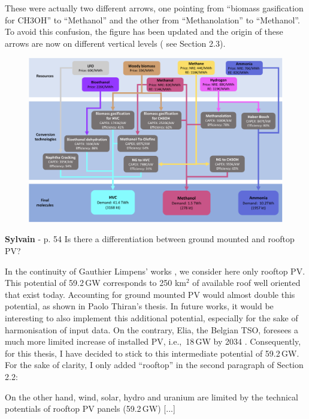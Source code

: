 \documentclass[12pt,a4paper]{article}
\def\ie{i.e.,\ }
\begin{document}
\noindent These were actually two different arrows, one pointing from ``biomass gasification for CH3OH'' to ``Methanol'' and the other from ``Methanolation'' to ``Methanol''. To avoid this confusion, the figure has been updated and the origin of these arrows are now on different vertical levels ({\color{blue} see Section 2.3}).

\begin{figure}[htbp!]
\centering
\includegraphics[width=\textwidth]{NED_tech.pdf}
\label{fig:NED_tech}
\end{figure}

\begin{mdframed}[style=comment] %
{\color{purple} \textbf{Sylvain}} - p. 54 Is there a differentiation between ground mounted and rooftop PV?
\end{mdframed}

\noindent In the continuity of Gauthier Limpens' works \cite{limpens2021generating}, we consider here only rooftop PV. This potential of 59.2\,GW corresponds to 250 km$^2$ of available roof well oriented that exist today. Accounting for ground mounted PV would almost double this potential, as shown in Paolo Thiran's thesis. In future works, it would be interesting to also implement this additional potential, especially for the sake of harmonisation of input data. On the contrary, Elia, the Belgian TSO, foresees a much more limited increase of installed PV, \ie 18\,GW by 2034 \cite{Elia_2024_2034}. Consequently, for this thesis, I have decided to stick to this intermediate potential of 59.2\,GW. For the sake of clarity, I only added ``rooftop'' {\color{blue}in the second paragraph of Section 2.2}:

\begin{mdframed}[style=manuscript] %
On the other hand, wind, solar, hydro and uranium are limited by the technical potentials of rooftop PV panels (59.2\,GW) [...]
\end{mdframed}
\end{document}
